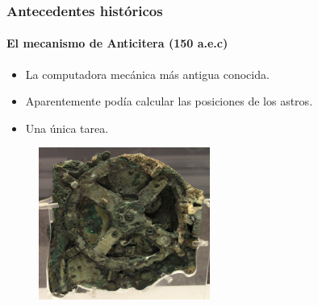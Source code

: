 \documentclass[11pt,a4paper,spanish]{beamer}
\newcommand{\aprox}{\raisebox{0.5ex}{\texttildelow}}
\begin{document}
\begin{frame}

\frametitle{Antecedentes históricos}
\framesubtitle{El mecanismo de Anticitera ({\aprox}150 a.e.c)}


\begin{itemize}
    \item La computadora mecánica más antigua conocida.
    \item Aparentemente podía calcular las posiciones de los astros.
    \item Una única tarea.
\end{itemize}


    \begin{figure}
        \includegraphics[width=0.5\textwidth]{img/anticitera.jpg}
        \captionsetup{textfont=tiny,labelformat=empty}
        \caption{\ccbysa\cite{anticitera}}
    \end{figure}


\end{frame}
\end{document}
